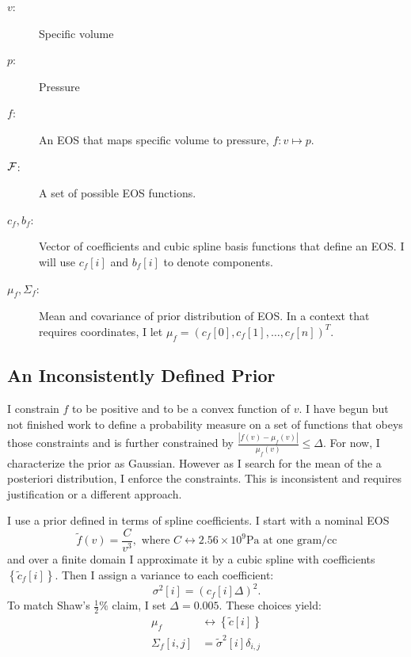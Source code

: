 \documentclass[11pt]{article}
\newcommand\vol{v}        %
\newcommand{\pressure}{p}
\newcommand{\eos}{f}
\newcommand{\eosnom}{\tilde f}
\newcommand{\EOS}{{\cal F}}
\newcommand\cf{c_f}
\newcommand\fbasis{b_f}
\begin{document}
\begin{description}
\item[$\vol$:] Specific volume
\item[$\pressure$:] Pressure
\item[$\eos$:] An EOS that maps specific volume to pressure, $\eos: \vol
  \mapsto \pressure$.
\item[$\EOS$:] A set of possible EOS functions.
\item[$\cf,\fbasis$:] Vector of coefficients and cubic spline basis
  functions that define an EOS.  I will use $\cf[i]$ and $\fbasis[i]$
  to denote components.
\item[$\mu_\eos, \Sigma_\eos$:] Mean and covariance of prior
  distribution of EOS.  In a context that requires coordinates, I let
  $\mu_\eos = \left( \cf[0], \cf[1], \ldots , \cf[n] \right)^T$.
\end{description}

\subsection{An Inconsistently Defined Prior}
\label{sec:eos-prior}

I constrain $\eos$ to be positive and to be a convex function of
$\vol$.  I have begun but not finished work to define a probability
measure on a set of functions that obeys those constraints and is
further constrained by $\frac{\left| \eos(\vol) - \mu_\eos(\vol)
  \right|}{\mu_\eos(\vol)} \leq \Delta$.  For now, I characterize the
prior as Gaussian.  However as I search for the mean of the a
posteriori distribution, I enforce the constraints.  This is
inconsistent and requires justification or a different approach.

I use a prior defined in terms of spline coefficients.  I start with a
nominal EOS
\begin{equation}
  \label{eq:nom}
  \eosnom(\vol) = \frac{C}{\vol^3}, \text{ where } C \leftrightarrow
  2.56\times10^9 \text{Pa} \text{ at one gram/cc}
\end{equation}
and over a finite domain I approximate it by a cubic spline with
coefficients $\left\{\tilde \cf[i] \right\}$.  Then I assign a variance to
  each coefficient:
\begin{equation}
  \label{eq:3}
  \sigma^2[i] = \left( \cf[i] \Delta \right)^2.
\end{equation}
To match Shaw's $\frac{1}{2} \%$ claim, I set $\Delta = 0.005$.  These
choices yield:
\begin{align*}
  \mu_\eos &\leftrightarrow \left\{\tilde c[i] \right\} \\
  \Sigma_\eos[i,j] &= \tilde \sigma^2[i] \delta_{i,j}
\end{align*}
\end{document}
